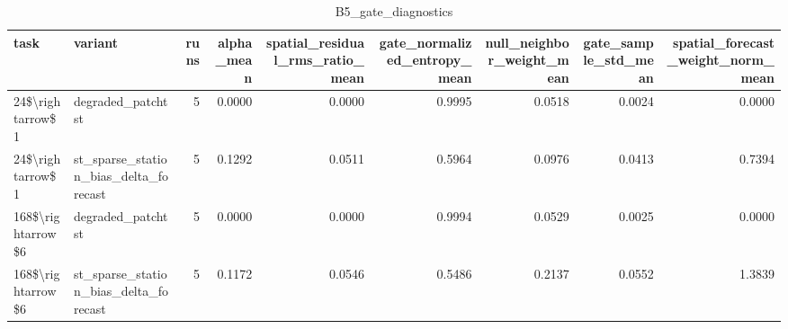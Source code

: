 \begin{table}
\caption{B5_gate_diagnostics}
\label{tab:B5_gate_diagnostics}
\begin{tabular}{llrrrrrrr}
\toprule
task & variant & runs & alpha\_mean & spatial\_residual\_rms\_ratio\_mean & gate\_normalized\_entropy\_mean & null\_neighbor\_weight\_mean & gate\_sample\_std\_mean & spatial\_forecast\_weight\_norm\_mean \\
\midrule
24\$\textbackslash rightarrow\$1 & degraded\_patchtst & 5 & 0.0000 & 0.0000 & 0.9995 & 0.0518 & 0.0024 & 0.0000 \\
24\$\textbackslash rightarrow\$1 & st\_sparse\_station\_bias\_delta\_forecast & 5 & 0.1292 & 0.0511 & 0.5964 & 0.0976 & 0.0413 & 0.7394 \\
168\$\textbackslash rightarrow\$6 & degraded\_patchtst & 5 & 0.0000 & 0.0000 & 0.9994 & 0.0529 & 0.0025 & 0.0000 \\
168\$\textbackslash rightarrow\$6 & st\_sparse\_station\_bias\_delta\_forecast & 5 & 0.1172 & 0.0546 & 0.5486 & 0.2137 & 0.0552 & 1.3839 \\
\bottomrule
\end{tabular}
\end{table}
